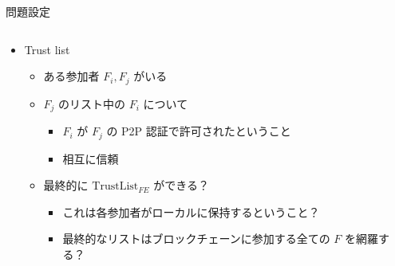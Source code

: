 \documentclass[unicode,12pt,aspectratio=169, dvipdfmx]{beamer}
\begin{document}
    \begin{frame}{問題設定}
        \begin{columns}
            \begin{column}[T]{.7\linewidth}
                \begin{itemize}
                    \item Trust list
                    \begin{itemize}
                      \item ある参加者 $F_i, F_j$ がいる
                      \item $F_j$ のリスト中の $F_i$ について
                        \begin{itemize}
                          \item $F_i$ が $F_j$ の P2P 認証で許可されたということ
                          \item 相互に信頼
                        \end{itemize}
                      \item 最終的に $\mathrm{TrustList}_{FE}$ ができる？
                        \begin{itemize}
                          \item これは各参加者がローカルに保持するということ？
                          \item 最終的なリストはブロックチェーンに参加する全ての $F$ を網羅する？
                        \end{itemize}
                    \end{itemize}
                \end{itemize}
            \end{column}
        \end{columns}
    \end{frame}
\end{document}
